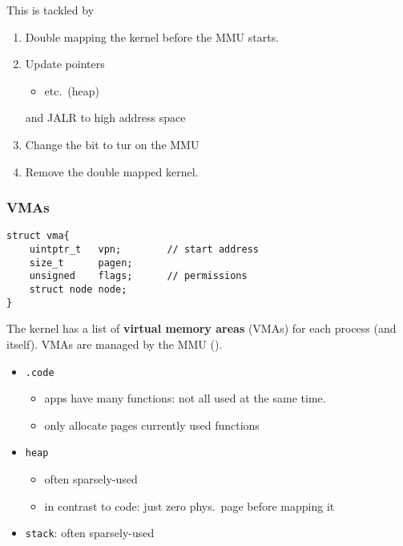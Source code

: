 This is tackled by
\begin{enumerate}
    \item Double mapping the kernel before the MMU starts.
    \item Update pointers
          \begin{itemize}
              \item {} etc.\ (heap)
          \end{itemize}
          and JALR to high address space
    \item Change the  bit to tur on the MMU
    \item Remove the double mapped kernel.
\end{enumerate}

\subsubsection{VMAs}
\begin{lstlisting}[style=bright_C++]
struct vma{
    uintptr_t   vpn;        // start address
    size_t      pagen;
    unsigned    flags;      // permissions
    struct node node;
}
\end{lstlisting}

The kernel has a list of \textbf{virtual memory areas} (VMAs) for each process (and itself). VMAs are managed by the MMU ().


\newpar{}
\begin{itemize}
    \item \texttt{.code}
          \begin{itemize}
              \item apps have many functions: not all used at the same time.
              \item only allocate pages currently used functions
          \end{itemize}
    \item \texttt{heap}
          \begin{itemize}
              \item often sparsely-used
              \item in contrast to code: just zero phys.\ page before mapping it
          \end{itemize}
    \item \texttt{stack}: often sparsely-used
\end{itemize}

